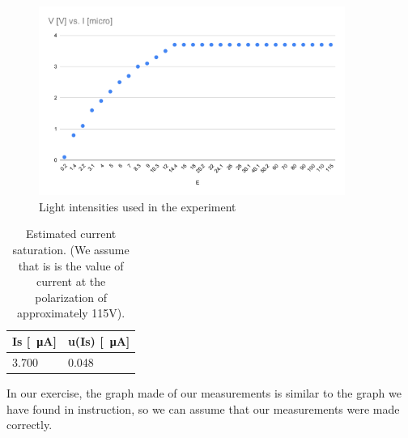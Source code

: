 \begin{figure}[H]
	\centering
	\includegraphics[width=10cm]{schematics/currentVoltageCharacteristics.pdf}
	\caption{Light intensities used in the experiment}
\end{figure}

\begin{table}[H]
    \centering
    \begin{tabular}{l|l}
    
        Is [\SI{}{\micro\ampere}] & u(Is) [\SI{}{\micro\ampere}] \\ \hline
        3.700 & 0.048 \\ 
    \end{tabular}
    \caption{Estimated current saturation. (We assume that is
is the value of current at the polarization of approximately 115V).}
\end{table}

In our exercise, the graph made of our measurements is similar to the graph we have found in instruction, so we can assume that our measurements were made correctly.




